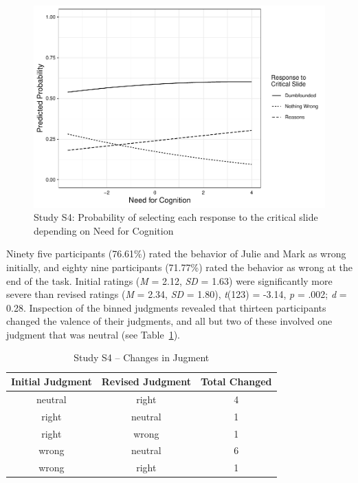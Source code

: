 \documentclass[
  man,floatsintext]{apa6}
\begin{document}
\begin{figure}[!h]
\includegraphics{Supplementary_files/figure-latex/ggplotlogit4-1} \caption{Study S4: Probability of selecting each response to the critical slide depending on Need for Cognition}\label{fig:ggplotlogit4}
\end{figure}

Ninety five participants (76.61\%) rated the behavior of Julie and Mark as wrong initially, and eighty nine participants (71.77\%) rated the behavior as wrong at the end of the task. Initial ratings (\emph{M} = 2.12, \emph{SD} = 1.63) were significantly more severe than revised ratings (\emph{M} = 2.34, \emph{SD} = 1.80), \emph{t}(123) = -3.14, \emph{p} = .002; \emph{d} = 0.28. Inspection of the binned judgments revealed that thirteen participants changed the valence of their judgments, and all but two of these involved one judgment that was neutral (see Table~\ref{tab:tabS4change}).

\begin{table}[tbp]

\begin{center}
\begin{threeparttable}

\caption{\label{tab:tabS4change}Study S4 – Changes in Jugment}

\begin{tabular}{ccc}
\toprule
Initial Judgment & \multicolumn{1}{c}{Revised Judgment} & \multicolumn{1}{c}{Total Changed}\\
\midrule
neutral & right & 4\\
right & neutral & 1\\
right & wrong & 1\\
wrong & neutral & 6\\
wrong & right & 1\\
\bottomrule
\end{tabular}

\end{threeparttable}
\end{center}

\end{table}
\end{document}
